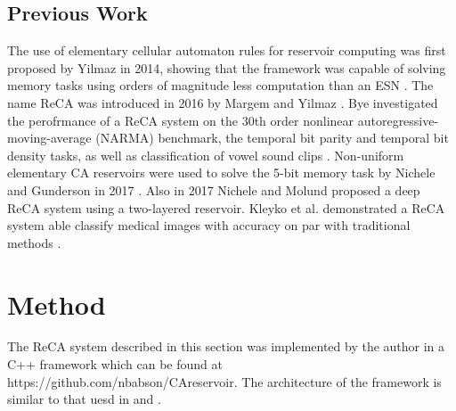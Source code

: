 \documentclass{elsarticle}
\begin{document}
\begin{multicols}{2}
\subsection{Previous Work}

The use of elementary cellular automaton rules for reservoir computing was 
   first proposed by Yilmaz in 2014, showing that the framework was capable of 
   solving memory tasks using orders of magnitude less computation than an ESN 
   \cite{yilmaz2014reservoir}. The name ReCA was introduced in 2016 by Margem 
   and Yilmaz \cite{margem2017experimental}. Bye investigated the perofrmance 
   of a ReCA system on the 30th order nonlinear autoregressive-moving-average 
   (NARMA) benchmark, the temporal bit parity and temporal bit density tasks, 
   as well as classification of vowel sound clips \cite{bye2016investigation}.  
      Non-uniform elementary CA reservoirs were used to solve the 5-bit memory 
      task by Nichele and Gunderson in 2017 \cite{nichele2017reservoir}. Also 
      in 2017 Nichele and Molund proposed a deep ReCA system using a 
      two-layered reservoir. Kleyko et al. demonstrated a ReCA system able 
      classify medical images with accuracy on par with traditional methods 
      \cite{kleyko2017modality}.
 





\section{Method}\label{method}
The ReCA system described in this section was implemented by the author in a 
C++ framework which can be found at https://github.com/nbabson/CAreservoir. The 
architecture of the framework is similar to that uesd in  
\cite{nichele2017deep} and \cite{bye2016investigation}.


\end{multicols}
\end{document}
